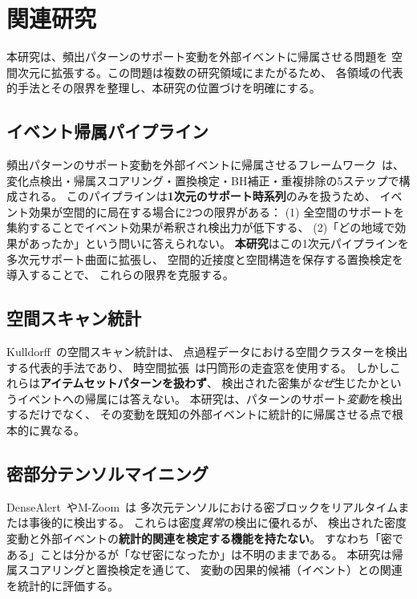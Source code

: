 \section{関連研究}\label{sec:related}

本研究は、頻出パターンのサポート変動を外部イベントに帰属させる問題を
空間次元に拡張する。この問題は複数の研究領域にまたがるため、
各領域の代表的手法とその限界を整理し、本研究の位置づけを明確にする。

\subsection{イベント帰属パイプライン}

頻出パターンのサポート変動を外部イベントに帰属させるフレームワーク~\cite{dsaa2025}は、
変化点検出・帰属スコアリング・置換検定・BH補正・重複排除の5ステップで構成される。
このパイプラインは\textbf{1次元のサポート時系列}のみを扱うため、
イベント効果が空間的に局在する場合に2つの限界がある：
(1) 全空間のサポートを集約することでイベント効果が希釈され検出力が低下する、
(2)「どの地域で効果があったか」という問いに答えられない。
\textbf{本研究}はこの1次元パイプラインを多次元サポート曲面に拡張し、
空間的近接度と空間構造を保存する置換検定を導入することで、
これらの限界を克服する。

\subsection{空間スキャン統計}

Kulldorff~\cite{kulldorff1997spatial}の空間スキャン統計は、
点過程データにおける空間クラスターを検出する代表的手法であり、
時空間拡張~\cite{kulldorff2001prospective}は円筒形の走査窓を使用する。
しかしこれらは\textbf{アイテムセットパターンを扱わず}、
検出された密集が\emph{なぜ}生じたかというイベントへの帰属には答えない。
本研究は、パターンのサポート\emph{変動}を検出するだけでなく、
その変動を既知の外部イベントに統計的に帰属させる点で根本的に異なる。

\subsection{密部分テンソルマイニング}

DenseAlert~\cite{shin2017densealert}やM-Zoom~\cite{shin2018mzoom}は
多次元テンソルにおける密ブロックをリアルタイムまたは事後的に検出する。
これらは密度\emph{異常}の検出に優れるが、
検出された密度変動と外部イベントの\textbf{統計的関連を検定する機能を持たない}。
すなわち「密である」ことは分かるが「なぜ密になったか」は不明のままである。
本研究は帰属スコアリングと置換検定を通じて、
変動の因果的候補（イベント）との関連を統計的に評価する。

